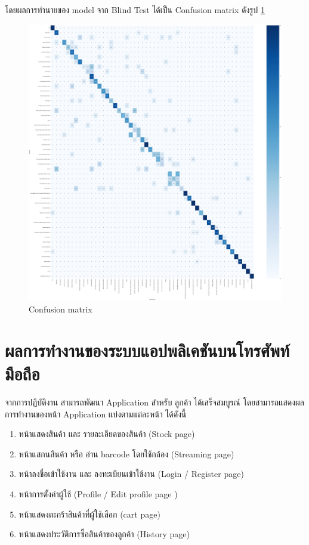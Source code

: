 โดยผลการทำนายของ model  จาก Blind Test ได้เป็น Confusion matrix ดังรูป \ref{fig:Confusion matrix}
\begin{figure}[h]
    \begin{center}

        \includegraphics[scale=0.1]{pic/model/blind_pic_4_ccm.png}
    \end{center}

    \caption[Confusion matrix]{Confusion matrix}
    \label{fig:Confusion matrix}
\end{figure}




\newpage
\section{ผลการทำงานของระบบแอปพลิเคชันบนโทรศัพท์มือถือ}



จากการปฏิบัติงาน สามารถพัฒนา Application สำหรับ ลูกค้า ได้เสร็จสมบูรณ์ โดยสามารถแสดงผลการทำงานของหน้า Application แบ่งตามแต่ละหน้า ได้ดังนี้
\begin{enumerate}
    \item หน้าแสดงสินค้า และ รายละเอียดของสินค้า (Stock page)
    \item หน้าแสกนสินค้า หรือ อ่าน barcode โดยใช้กล้อง (Streaming page)
    \item หน้าลงชื่อเข้าใช้งาน และ ลงทะเบียนเข้าใช้งาน (Login / Register page)
    \item หน้าการตั้งค่าผู้ใช้  (Profile / Edit profile page )
    \item หน้าแสดงตะกร้าสินค้าที่ผู้ใช้เลือก (cart page)
    \item หน้าแสดงประวัติการซื้อสินค้าของลูกค้า (History page)
\end{enumerate}

